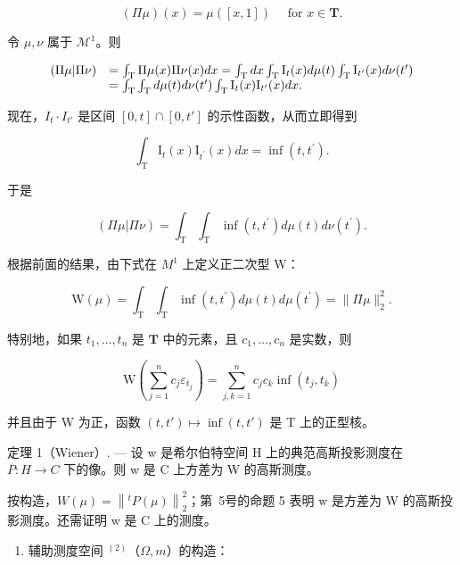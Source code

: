 \[
(\Pi \mu) (x) = \mu ([ x, 1 ]) \quad \text { for } x \in \mathbf {T}.\tag{34}
\]

令 \(\mu, \nu\) 属于 \(\mathcal{M}^1\)。则

\[
\begin{array}{r l} (\Pi \mu | \Pi \nu) & = \int_ {\mathrm{T}} \Pi \mu (x) \Pi \nu (x) d x = \int_ {\mathrm{T}} d x \int_ {\mathrm{T}} \mathrm{I} _ {t} (x) d \mu (t) \int_ {\mathrm{T}} \mathrm{I} _ {t ^ {\prime}} (x) d \nu (t ^ {\prime}) \\ & = \int_ {\mathrm{T}} \int_ {\mathrm{T}} d \mu (t) d \nu (t ^ {\prime}) \int_ {\mathrm{T}} \mathrm{I} _ {t} (x) \mathrm{I} _ {t ^ {\prime}} (x) d x. \end{array}
\]

现在，\(I_{t} \cdot I_{t'}\) 是区间 \([0, t] \cap [0, t']\) 的示性函数，从而立即得到

\[
\int_ {\mathrm{T}} \mathrm{I} _ {t} (x) \mathrm{I} _ {t ^ {\prime}} (x) d x = \inf (t, t ^ {\prime}).\tag{35}
\]

于是

\[
(\Pi \mu | \Pi \nu) = \int_ {\mathrm{T}} \int_ {\mathrm{T}} \inf (t, t ^ {\prime}) d \mu (t) d \nu (t ^ {\prime}).\tag{36}
\]

根据前面的结果，由下式在 \(M^{1}\) 上定义正二次型 W：

\[
\mathrm{W} (\mu) = \int_ {\mathrm{T}} \int_ {\mathrm{T}} \inf (t, t ^ {\prime}) d \mu (t) d \mu (t ^ {\prime}) = \| \Pi \mu \| _ {2} ^ {2}.\tag{37}
\]

特别地，如果 \(t_1, \ldots, t_n\) 是 \(\mathbf{T}\) 中的元素，且 \(c_1, \ldots, c_n\) 是实数，则

\[
\mathrm{W} \left(\sum_ {j = 1} ^ {n} c _ {j} \varepsilon_ {t _ {j}}\right) = \sum_ {j, k = 1} ^ {n} c _ {j} c _ {k} \inf (t _ {j}, t _ {k})
\]

并且由于 W 为正，函数 \((t, t') \mapsto \inf(t, t')\) 是 T 上的正型核。

定理 1（Wiener）. --- 设 w 是希尔伯特空间 H 上的典范高斯投影测度在 \(P: H \to C\) 下的像。则 w 是 C 上方差为 W 的高斯测度。

按构造，\(W(\mu) = \left\|^{t} P(\mu) \right\|_{2}^{2}\)；第~5号的命题 5 表明 w 是方差为 W 的高斯投影测度。还需证明 w 是 C 上的测度。

\begin{enumerate}
\def\labelenumi{\Alph{enumi})}
\tightlist
\item
  辅助测度空间 \(^{(2)}\)（\(\Omega, m\)）的构造：
\end{enumerate}

